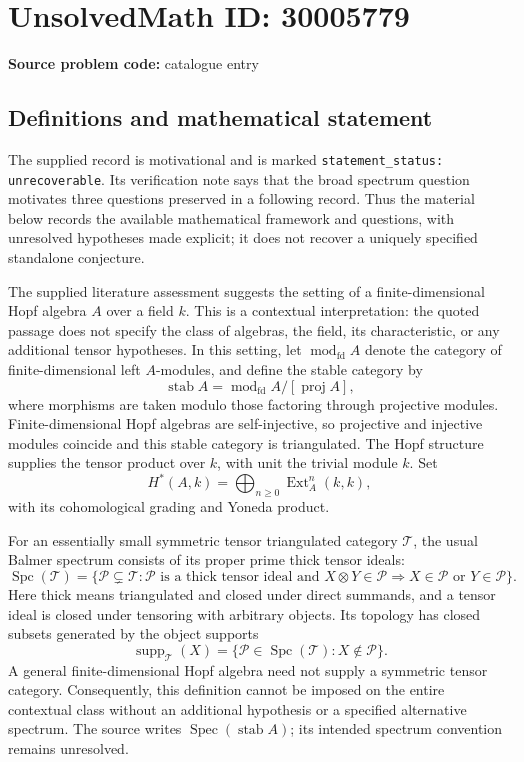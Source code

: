 \documentclass[11pt]{article}
\begin{document}
\section*{UnsolvedMath ID: 30005779}
\textbf{Source problem code:} catalogue entry
\subsection{Definitions and mathematical statement}
The supplied record is motivational and is marked \texttt{statement\_status: unrecoverable}. Its verification note says that the broad spectrum question motivates three questions preserved in a following record. Thus the material below records the available mathematical framework and questions, with unresolved hypotheses made explicit; it does not recover a uniquely specified standalone conjecture.

The supplied literature assessment suggests the setting of a finite-dimensional Hopf algebra \(A\) over a field \(k\). This is a contextual interpretation: the quoted passage does not specify the class of algebras, the field, its characteristic, or any additional tensor hypotheses. In this setting, let \(\operatorname{mod}_{\mathrm{fd}}A\) denote the category of finite-dimensional left \(A\)-modules, and define the stable category by
\[
\operatorname{stab}A
 =\operatorname{mod}_{\mathrm{fd}}A/[\operatorname{proj}A],
\]
where morphisms are taken modulo those factoring through projective modules. Finite-dimensional Hopf algebras are self-injective, so projective and injective modules coincide and this stable category is triangulated. The Hopf structure supplies the tensor product over \(k\), with unit the trivial module \(k\). Set
\[
H^*(A,k)=\bigoplus_{n\geq 0}\operatorname{Ext}^n_A(k,k),
\]
with its cohomological grading and Yoneda product.

For an essentially small symmetric tensor triangulated category \(\mathcal T\), the usual Balmer spectrum consists of its proper prime thick tensor ideals:
\[
\operatorname{Spc}(\mathcal T)
 =\{\mathcal P\subsetneq\mathcal T:\mathcal P\text{ is a thick tensor ideal and }
 X\otimes Y\in\mathcal P\Rightarrow X\in\mathcal P\text{ or }Y\in\mathcal P\}.
\]
Here thick means triangulated and closed under direct summands, and a tensor ideal is closed under tensoring with arbitrary objects. Its topology has closed subsets generated by the object supports
\[
\operatorname{supp}_{\mathcal T}(X)
 =\{\mathcal P\in\operatorname{Spc}(\mathcal T):X\notin\mathcal P\}.
\]
A general finite-dimensional Hopf algebra need not supply a symmetric tensor category. Consequently, this definition cannot be imposed on the entire contextual class without an additional hypothesis or a specified alternative spectrum. The source writes \(\operatorname{Spec}(\operatorname{stab}A)\); its intended spectrum convention remains unresolved.
\end{document}
